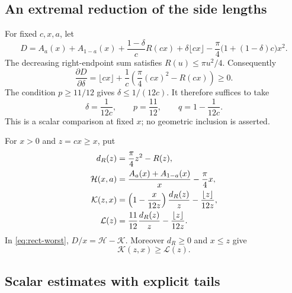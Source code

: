 \documentclass[11pt,reqno]{amsart}
\numberwithin{equation}{section}
\begin{document}
\subsection*{An extremal reduction of the side lengths}

For fixed $c,x,a$, let
\begin{equation}\label{eq:rect-D}
 D=A_a(x)+A_{1-a}(x)+\frac{1-\delta}{c}R(cx)
       +\delta\lfloor cx\rfloor
       -\frac\pi4\bigl(1+(1-\delta)c\bigr)x^2.
\end{equation}
The decreasing right-endpoint sum satisfies $R(u)\le\pi u^2/4$.
Consequently
\[
 \frac{\partial D}{\partial\delta}
 =\lfloor cx\rfloor+\frac1c\left(\frac\pi4(cx)^2-R(cx)\right)
 \ge0.
\]
The condition $p\ge11/12$ gives $\delta\le1/(12c)$.
It therefore suffices to take
\begin{equation}\label{eq:rect-worst}
 \delta=\frac1{12c},\qquad p=\frac{11}{12},
 \qquad q=1-\frac1{12c}.
\end{equation}
This is a scalar comparison at fixed $x$; no geometric inclusion
is asserted.

For $x>0$ and $z=cx\ge x$, put
\begin{align}
 d_R(z)&=\frac\pi4z^2-R(z),\notag\\
 \mathcal H(x,a)&=\frac{A_a(x)+A_{1-a}(x)}x-\frac\pi4x,
       \label{eq:rect-HKL}\\
 \mathcal K(z,x)&=\left(1-\frac{x}{12z}\right)\frac{d_R(z)}z
                     -\frac{\lfloor z\rfloor}{12z},\notag\\
 \mathcal L(z)&=\frac{11}{12}\frac{d_R(z)}z
                     -\frac{\lfloor z\rfloor}{12z}.\notag
\end{align}
In \eqref{eq:rect-worst}, $D/x=\mathcal H-\mathcal K$.
Moreover $d_R\ge0$ and $x\le z$ give
\begin{equation}\label{eq:rect-KL}
 \mathcal K(z,x)\ge\mathcal L(z).
\end{equation}

\subsection*{Scalar estimates with explicit tails}
\end{document}
